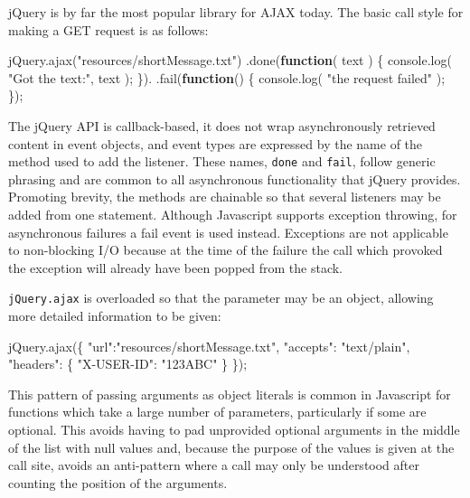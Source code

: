\documentclass[12pt, ]{article}
\newenvironment{Shaded}{}{}
\newcommand{\KeywordTok}[1]{\textcolor[rgb]{0.00,0.44,0.13}{\textbf{{#1}}}}
\newcommand{\StringTok}[1]{\textcolor[rgb]{0.25,0.44,0.63}{{#1}}}
\newcommand{\OtherTok}[1]{\textcolor[rgb]{0.00,0.44,0.13}{{#1}}}
\newcommand{\FunctionTok}[1]{\textcolor[rgb]{0.02,0.16,0.49}{{#1}}}
\newcommand{\NormalTok}[1]{{#1}}
\begin{document}
jQuery is by far the most popular library for AJAX today. The basic call
style for making a GET request is as follows:

\begin{Shaded}
\begin{Highlighting}[]
\OtherTok{jQuery}\NormalTok{.}\FunctionTok{ajax}\NormalTok{(}\StringTok{"resources/shortMessage.txt"}\NormalTok{)}
   \NormalTok{.}\FunctionTok{done}\NormalTok{(}\KeywordTok{function}\NormalTok{( text ) \{}
      \OtherTok{console}\NormalTok{.}\FunctionTok{log}\NormalTok{( }\StringTok{"Got the text:"}\NormalTok{, text ); }
   \NormalTok{\}).}
   \NormalTok{.}\FunctionTok{fail}\NormalTok{(}\KeywordTok{function}\NormalTok{() \{}
      \OtherTok{console}\NormalTok{.}\FunctionTok{log}\NormalTok{( }\StringTok{"the request failed"} \NormalTok{);      }
   \NormalTok{\});}
\end{Highlighting}
\end{Shaded}

The jQuery API is callback-based, it does not wrap asynchronously
retrieved content in event objects, and event types are expressed by the
name of the method used to add the listener. These names, \texttt{done}
and \texttt{fail}, follow generic phrasing and are common to all
asynchronous functionality that jQuery provides. Promoting brevity, the
methods are chainable so that several listeners may be added from one
statement. Although Javascript supports exception throwing, for
asynchronous failures a fail event is used instead. Exceptions are not
applicable to non-blocking I/O because at the time of the failure the
call which provoked the exception will already have been popped from the
stack.

\texttt{jQuery.ajax} is overloaded so that the parameter may be an
object, allowing more detailed information to be given:

\begin{Shaded}
\begin{Highlighting}[]
\OtherTok{jQuery}\NormalTok{.}\FunctionTok{ajax}\NormalTok{(\{ }\StringTok{"url"}\NormalTok{:}\StringTok{"resources/shortMessage.txt"}\NormalTok{,}
              \StringTok{"accepts"}\NormalTok{: }\StringTok{"text/plain"}\NormalTok{,}
              \StringTok{"headers"}\NormalTok{: \{ }\StringTok{"X-USER-ID"}\NormalTok{: }\StringTok{"123ABC"} \NormalTok{\}}
           \NormalTok{\});}
\end{Highlighting}
\end{Shaded}

This pattern of passing arguments as object literals is common in
Javascript for functions which take a large number of parameters,
particularly if some are optional. This avoids having to pad unprovided
optional arguments in the middle of the list with null values and,
because the purpose of the values is given at the call site, avoids an
anti-pattern where a call may only be understood after counting the
position of the arguments.
\end{document}
